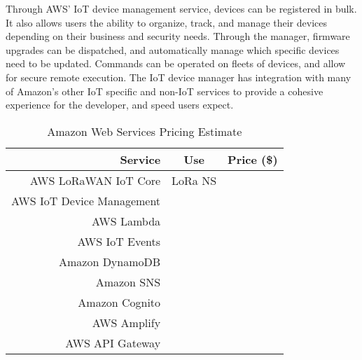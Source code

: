 Through AWS' IoT device management service, devices can be registered in bulk. It also allows users
the ability to organize, track, and manage their devices depending on their business and security
needs. Through the manager, firmware upgrades can be dispatched, and automatically manage which
specific devices need to be updated. Commands can be operated on fleets of devices, and allow for
secure remote execution. The IoT device manager has integration with many of Amazon's other IoT
specific and non-IoT services to provide a cohesive experience for the developer, and speed users
expect.

\begin{table}[H]
\centering%
\caption{Amazon Web Services Pricing Estimate}
\begin{tabular}{|r|c|c|}
\hline
Service & Use & Price (\$)\\
\hline\hline

AWS LoRaWAN IoT Core & LoRa NS & \\\hline
AWS IoT Device Management & & \\\hline
AWS Lambda & & \\\hline
AWS IoT Events & & \\\hline
Amazon DynamoDB & & \\\hline
Amazon SNS & & \\\hline
Amazon Cognito & & \\\hline
AWS Amplify & & \\\hline
AWS API Gateway & & \\\hline

\end{tabular}
\label{tbl:aws-pricing}
\end{table}


